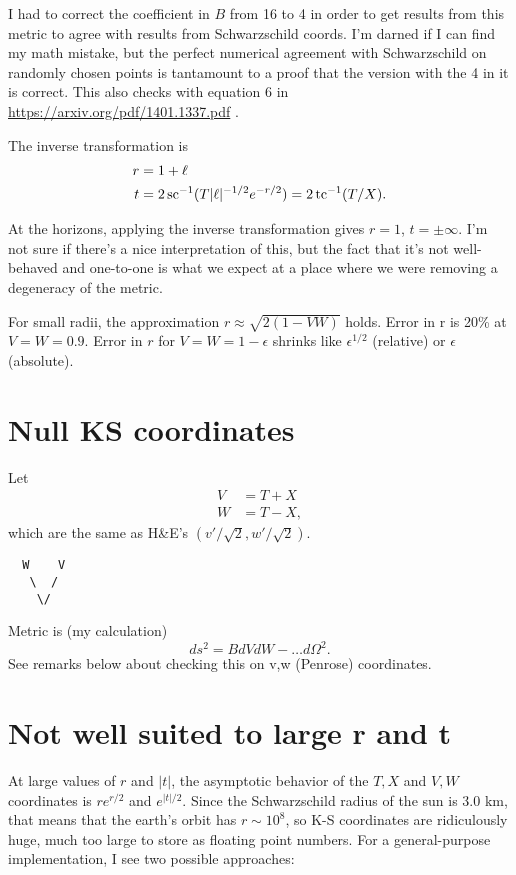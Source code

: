 \documentclass{article}
\begin{document}
I had to correct the coefficient in $B$ from 16 to 4
in order to get results from this metric to agree with results from Schwarzschild coords.
I'm darned if I can find my math mistake, but the perfect numerical agreement with
Schwarzschild on randomly chosen points is tantamount to a proof that the version with
the 4 in it is correct. This also checks with equation 6 in \url{https://arxiv.org/pdf/1401.1337.pdf} .

The inverse transformation is
\begin{align}
  r &= 1+\ell  \\
  t &= 2\operatorname{sc}^{-1}(T|\ell |^{-1/2}e^{-r/2}) = 2\operatorname{tc}^{-1}(T/X).
\end{align}

At the horizons, applying the inverse transformation gives $r=1$, $t=\pm\infty$. I'm not
sure if there's a nice interpretation of this, but the fact that it's not well-behaved
and one-to-one is what we expect at a place where we were removing a degeneracy of the metric.

For small radii,
the approximation $r\approx\sqrt{2(1-VW)}$ holds. 
Error in r is 20\% at $V=W=0.9$. Error in $r$ for $V=W=1-\epsilon$
shrinks like $\epsilon^{1/2}$ (relative) or $\epsilon$ (absolute).

\section{Null KS coordinates}

Let
\begin{align}
  V &= T+X\\
  W &= T-X,
\end{align}
which are the same as H\&E's $(v'/\sqrt2,w'/\sqrt2)$.
\begin{verbatim}
  W    V
   \  /
    \/
\end{verbatim}
Metric is (my calculation)
\begin{equation}
  ds^2 = B dVdW-\ldots d\Omega^2.
\end{equation}
See remarks below about checking this on v,w (Penrose) coordinates.

\section{Not well suited to large r and t}

At large values of $r$ and $|t|$, the asymptotic behavior of the $T,X$ and $V,W$ coordinates
is $re^{r/2}$ and $e^{|t|/2}$. Since the Schwarzschild radius of the sun is 3.0 km, that means
that the earth's orbit has $r\sim 10^8$, so K-S coordinates are ridiculously huge, much too
large to store as floating point numbers. For a general-purpose implementation, I see two possible
approaches:
\end{document}
